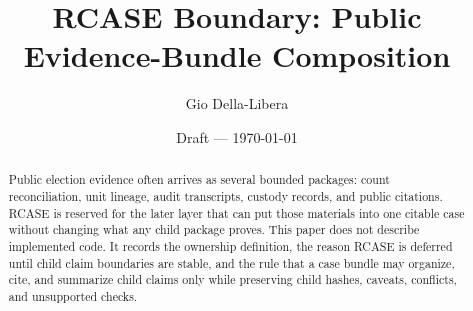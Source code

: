 \documentclass[12pt]{article}
\title{RCASE Boundary: Public Evidence-Bundle Composition}
\author{Gio Della-Libera}
\date{Draft --- \today}
\begin{document}
\maketitle

\begin{abstract}
Public election evidence often arrives as several bounded packages: count
reconciliation, unit lineage, audit transcripts, custody records, and public
citations. RCASE is reserved for the later layer that can put those materials
into one citable case without changing what any child package proves. This paper
does not describe implemented code. It records the ownership definition, the
reason RCASE is deferred until child claim boundaries are stable, and the rule
that a case bundle may organize, cite, and summarize child claims only while
preserving child hashes, caveats, conflicts, and unsupported checks.
\end{abstract}






\nocite{rcount-overview-2026,civic-evidence-boundaries-2026}


\end{document}
